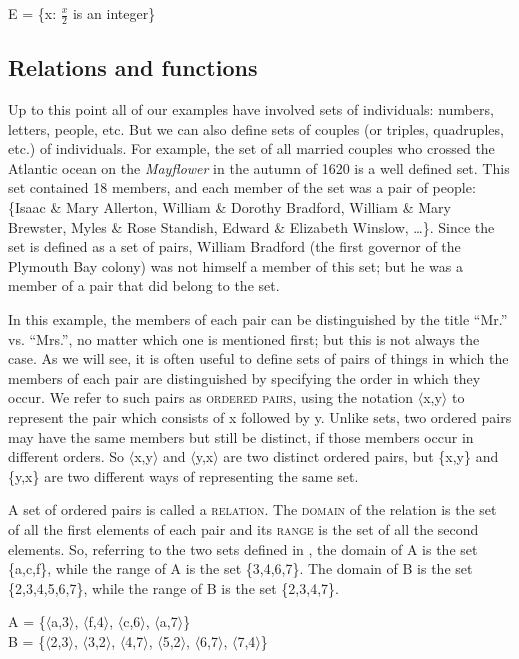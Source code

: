\ea \label{ex:13.6}
E = \{x: $\frac{x}{2}$ is an integer\}
\z

\subsection{Relations and functions}\label{sec:13.3.1}

Up to this point all of our examples have involved sets of individuals: numbers, letters, people, etc. But we can also define sets of couples (or triples, quadruples, etc.) of individuals. For example, the set of all married couples who crossed the {Atlantic} ocean on the \textit{Mayflower} in the autumn of 1620 is a well defined set. This set contained 18 members, and each member of the set was a pair of people: \{Isaac \& Mary Allerton, William \& Dorothy Bradford, William \& Mary Brewster, Myles \& Rose Standish, Edward \& Elizabeth Winslow, …\}. Since the set is defined as a set of pairs, William Bradford (the first governor of the Plymouth Bay colony) was not himself a member of this set; but he was a member of a pair that did belong to the set.



In this example, the members of each pair can be distinguished by the title “Mr.” vs. “Mrs.”, no matter which one is mentioned first; but this is not always the case. As we will see, it is often useful to define sets of pairs of things in which the members of each pair are distinguished by specifying the order in which they occur. We refer to such pairs as \textsc{ordered pairs}, using the notation $\langle$x,y$\rangle$ to represent the pair which consists of x followed by y. Unlike sets, two ordered pairs may have the same members but still be distinct, if those members occur in different orders. So $\langle$x,y$\rangle$ and $\langle$y,x$\rangle$ are two distinct ordered pairs, but \{x,y\} and \{y,x\} are two different ways of representing the same set.



A set of ordered pairs is called a \textsc{relation}. The \textsc{domain} of the relation is the set of all the first elements of each pair and its \textsc{range} is the set of all the second elements. So, referring to the two sets defined in , the domain of A is the set \{a,c,f\}, while the range of A is the set \{3,4,6,7\}. The domain of B is the set \{2,3,4,5,6,7\}, while the range of B is the set \{2,3,4,7\}. 


\ea \label{ex:13.7}
A = \{$\langle$a,3$\rangle$, $\langle$f,4$\rangle$, $\langle$c,6$\rangle$, $\langle$a,7$\rangle$\}\\
B = \{$\langle$2,3$\rangle$, $\langle$3,2$\rangle$, $\langle$4,7$\rangle$, $\langle$5,2$\rangle$, $\langle$6,7$\rangle$, $\langle$7,4$\rangle$\}
\z


